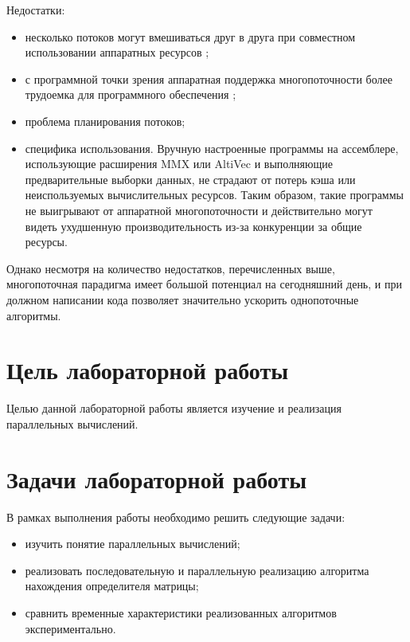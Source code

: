 \documentclass[12pt]{report}
\begin{document}
    Недостатки:

    \begin{itemize}
        \item несколько потоков могут вмешиваться друг в друга при совместном
        использовании аппаратных ресурсов \cite{Nemirovsky};
        \item с программной точки зрения аппаратная поддержка многопоточности
        более трудоемка для программного обеспечения \cite{Olukotun};
        \item проблема планирования потоков;
        \item специфика использования. Вручную настроенные программы на ассемблере,
        использующие расширения MMX или AltiVec и выполняющие предварительные выборки данных,
        не страдают от потерь кэша или неиспользуемых вычислительных ресурсов.
        Таким образом, такие программы не выигрывают от аппаратной многопоточности
        и действительно могут видеть ухудшенную производительность из-за конкуренции за общие ресурсы.
    \end{itemize}

    Однако несмотря на количество недостатков, перечисленных выше,
    многопоточная парадигма имеет большой потенциал на сегодняшний день,
    и при должном написании кода позволяет значительно ускорить однопоточные алгоритмы.

    \section*{Цель лабораторной работы}
    Целью данной лабораторной работы является изучение и реализация параллельных вычислений.

    \section*{Задачи лабораторной работы}
    В рамках выполнения работы необходимо решить следующие задачи:

    \begin{itemize}
        \item изучить понятие параллельных вычислений;
        \item реализовать последовательную и параллельную реализацию алгоритма нахождения определителя матрицы;
        \item сравнить временные характеристики реализованных алгоритмов экспериментально.
    \end{itemize}
\end{document}
